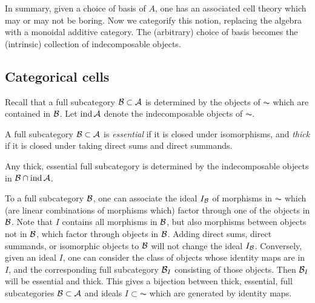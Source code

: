 In summary, given a choice of basis of $A$, one has an associated cell theory which may or may not be boring.  Now we categorify this notion, replacing the algebra with a monoidal additive category. The (arbitrary) choice of basis becomes the (intrinsic) collection of indecomposable objects.

\subsection{Categorical cells}
\label{subsec:celldef}


Recall that a full subcategory ${\mathcal{B}}\subset {\mathcal{A}}$ is determined by the objects of $\AC$ which are contained in ${\mathcal{B}}$. Let $\operatorname{ind} {\mathcal{A}}$ denote the indecomposable objects of $\AC$.

\begin{defn}
A full subcategory ${\mathcal{B}}\subset {\mathcal{A}}$ is \emph{essential} if it is closed under isomorphisms, and \emph{thick} if it is closed under taking direct sums and direct summands.
\end{defn}

\begin{remark}
Any thick, essential full subcategory is determined by the indecomposable objects in ${\mathcal{B}} \cap \operatorname{ind} {\mathcal{A}}$. 
\end{remark}


\begin{remark} To a full subcategory ${\mathcal{B}}$, one can associate the ideal $I_{{\mathcal{B}}}$ of morphisms in $\AC$ which (are linear combinations of morphisms which) factor through one of the
objects in ${\mathcal{B}}$. Note that $I$ contains all morphisms in ${\mathcal{B}}$, but also morphisms between objects not in ${\mathcal{B}}$, which factor through objects in ${\mathcal{B}}$. Adding direct sums, direct
summands, or isomorphic objects to ${\mathcal{B}}$ will not change the ideal $I_{{\mathcal{B}}}$. Conversely, given an ideal $I$, one can consider the class of objects whose identity maps are in $I$, and
the corresponding full subcategory ${\mathcal{B}}_I$ consisting of those objects. Then ${\mathcal{B}}_I$ will be essential and thick. This gives a bijection between thick, essential, full subcategories ${\mathcal{B}} \subset {\mathcal{A}}$ and ideals $I \subset \AC$ which are generated by identity maps.
\end{remark}


